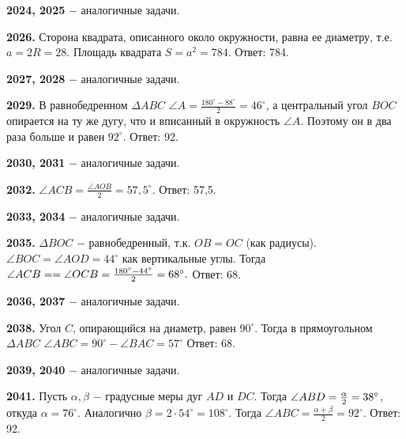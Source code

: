 \textbf{2024, 2025} $-$ аналогичные задачи.

\textbf{2026.} Сторона квадрата, описанного около окружности, равна ее диаметру, т.е. $a = 2R = 28$. Площадь квадрата $S = a^2 = 784$. \newline \null \hspace*{\fill} Ответ: 784.

\clearpage 

\textbf{2027, 2028} $-$ аналогичные задачи.

\textbf{2029.} В равнобедренном $\Delta ABC$ $\angle A = \frac{180^\circ - 88^\circ}{2} = 46^\circ$, а центральный угол $BOC$ опирается на ту же дугу, что и вписанный в окружность $\angle A$. Поэтому он в два раза больше и равен $92^\circ$. \newline \null \hspace*{\fill} Ответ: 92.

\textbf{2030, 2031} $-$ аналогичные задачи.

\textbf{2032.} $\angle ACB = \frac{\angle AOB}{2} = 57,5^\circ$. \newline \null \hspace*{\fill} Ответ: 57,5.

\textbf{2033, 2034} $-$ аналогичные задачи.

\textbf{2035.} $\Delta BOC$ $-$ равнобедренный, т.к. $OB=OC$ (как радиусы). $\angle BOC = \angle AOD = 44^\circ$ как вертикальные углы. Тогда $\angle ACB = \linebreak = \angle OCB = \frac{180^\circ-44^\circ}{2} = 68^\circ.$ \newline \null \hspace*{\fill} Ответ: 68.

\textbf{2036, 2037} $-$ аналогичные задачи.

\textbf{2038.} Угол $C$, опирающийся на диаметр, равен $90^\circ$. Тогда в прямоугольном $\Delta ABC$ $\angle ABC = 90^\circ - \angle BAC = 57^\circ$ \newline \null \hspace*{\fill} Ответ: 68.

\textbf{2039, 2040} $-$ аналогичные задачи.

\textbf{2041.} Пусть $\alpha, \beta$ $-$  градусные меры дуг $AD$ и $DC$. Тогда $\newline\angle ABD =  \frac{\alpha}{2} = 38^\circ$, откуда $\alpha = 76^\circ$. Аналогично $\beta = 2 \cdot 54^\circ = 108^\circ$.
Тогда $\angle ABC = \frac{\alpha + \beta}{2} = 92^\circ$. \newline \null \hspace*{\fill} Ответ: 92.

